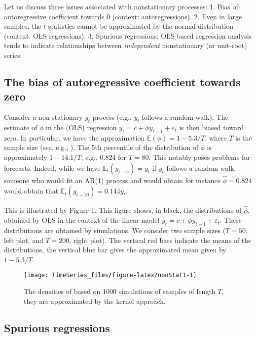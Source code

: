 \documentclass[
  12pt,
]{book}
\theoremstyle{definition}
\theoremstyle{definition}
\theoremstyle{definition}
\theoremstyle{definition}
\theoremstyle{remark}
\begin{document}
Let us discuss three issues associated with nonstationary processes:
1. Bias of autoregressive coefficient towards 0 (context: autoregressions).
2. Even in large samples, the \(t\)-statistics cannot be approximated by the normal distribution (context: OLS regressions).
3. Spurious regressions: OLS-based regression analysis tends to indicate relationships between \emph{independent} nonstationary (or unit-root) series.

\hypertarget{the-bias-of-autoregressive-coefficient-towards-zero}{%
\subsection{The bias of autoregressive coefficient towards zero}\label{the-bias-of-autoregressive-coefficient-towards-zero}}

Consider a non-stationary \(y_t\) process (e.g., \(y_t\) follows a random walk). The estimate of \(\phi\) in the (OLS) regression \(y_t = c + \phi y_{t-1} + \varepsilon_t\) is then biased toward zero. In particular, we have the approximation \(\mathbb{E}(\phi)=1-5.3/T\), where \(T\) is the sample size (see, e.g., \citet{Abadir_1993}). The 5th percentile of the distribution of \(\phi\) is approximately \(1 - 14.1/T\), e.g., 0.824 for \(T=80\). This notably poses problems for forecasts. Indeed, while we have \(\mathbb{E}_t(y_{t+h})=y_t\) if \(y_t\) follows a random walk, someone who would fit an AR(1) process and would obtain for instance \(\hat\phi=0.824\) would obtain that \(\mathbb{E}_t(y_{t+10})=0.144y_t\).

This is illustrated by Figure \ref{fig:nonStat1}. This figure shows, in black, the distributions of \(\hat\phi\), obtained by OLS in the context of the linear model \(y_t = c + \phi y_{t-1} + \varepsilon_t\). These distributions are obtained by simulations. We consider two sample sizes (\(T=50\), left plot, and \(T=200\), right plot). The vertical red bars indicate the means of the distributions, the vertical blue bar gives the approximated mean given by \(1-5.3/T\).

\begin{figure}
\texttt{[image: TimeSeries\_files/figure-latex/nonStat1-1]} \caption{The densities of based on 1000 simulations of samples of length $T$, they are approximated by the kernel approach.}\label{fig:nonStat1}
\end{figure}

\hypertarget{spurious-regressions}{%
\subsection{Spurious regressions}\label{spurious-regressions}}
\end{document}
